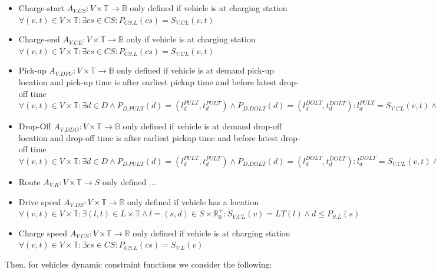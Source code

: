 \documentclass[graybox]{svmult}
\begin{document}
\begin{itemize}
	\item Charge-start $A_{V.CS}: V \times \mathbb{T} \rightarrow \mathbb{B}$ only defined if vehicle is at charging station $\forall (v,t) \in V \times \mathbb{T}: \exists cs \in CS: P_{CS.L}(cs) = S_{V.CL}(v, t)$
	\item Charge-end $A_{V.CE}: V \times \mathbb{T} \rightarrow \mathbb{B}$ only if vehicle is at charging station $\forall (v,t) \in V \times \mathbb{T}: \exists cs \in CS: P_{CS.L}(cs) = S_{V.CL}(v, t)$
	\item Pick-up $A_{V.DPU}: V \times \mathbb{T} \rightarrow \mathbb{B}$ only defined if vehicle is at demand pick-up location and pick-up time is after earliest pickup time and before latest drop-off time $\forall (v,t) \in V \times \mathbb{T}: \exists d \in D \wedge  P_{D.PULT}(d) = (l_d^{PULT},t_d^{PULT}) \wedge P_{D.DOLT}(d) = (l_d^{DOLT},t_d^{DOLT}): l_d^{PULT} = S_{V.CL}(v,t) \wedge t_d^{PULT} \leq t \leq t_d^{DOLT}$
	\item Drop-Off $A_{V.DDO}: V \times \mathbb{T} \rightarrow \mathbb{B}$ only defined if vehicle is at demand drop-off location and drop-off time is after earliest pickup time and before latest drop-off time $\forall (v,t) \in V \times \mathbb{T}: \exists d \in D \wedge  P_{D.PULT}(d) = (l_d^{PULT},t_d^{PULT}) \wedge P_{D.DOLT}(d) = (l_d^{DOLT},t_d^{DOLT}): l_d^{DOLT} = S_{V.CL}(v,t) \wedge t_d^{PULT} \leq t \leq t_d^{DOLT}$
	\item Route $A_{V.R}: V \times \mathbb{T} \rightarrow S$ only defined ...
	\item Drive speed $A_{V.DS}: V \times \mathbb{T} \rightarrow \mathbb{R}$ only defined if vehicle has a location $\forall (v,t) \in V \times \mathbb{T}: \exists (l, t) \in L \times \mathbb{T} \wedge l = (s, d) \in S \times \mathbb{R}_0^+: S_{V.CL}(v) = LT(l) \wedge d \leq P_{S.L}(s)$
	

	
	\item Charge speed $A_{V.CS}: V \times \mathbb{T} \rightarrow \mathbb{R}$ only defined if vehicle is at charging station $\forall (v,t) \in V \times \mathbb{T}: \exists cs \in CS: P_{CS.L}(cs) = S_{V.L}(v)$
\end{itemize}
Then, for vehicles dynamic constraint functions we consider the following:
\end{document}
